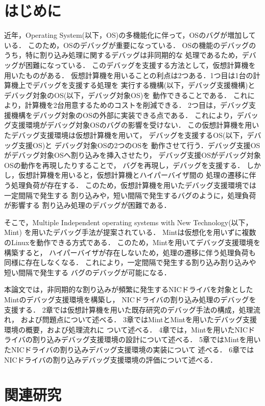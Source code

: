 \documentclass[tanilab-enum]{graduate}
\begin{document}
\chapter{はじめに}\label{chap:introduction}
近年，Operating System(以下，OS)の多機能化に伴って，OSのバグが増加している．
このため，OSのデバッグが重要になっている．
OSの機能のデバッグのうち，特に割り込み処理に関するデバッグは非同期的な
処理であるため，デバッグが困難になっている．
このデバッグを支援する方法として，仮想計算機を用いたものがある．
仮想計算機を用いることの利点は2つある．1つ目は1台の計算機上でデバッグを支援する処理を
実行する機構(以下，デバッグ支援機構)とデバッグ対象のOS(以下，デバッグ対象OS)を
動作できることである．
これにより，計算機を2台用意するためのコストを削減できる．
2つ目は，デバッグ支援機構をデバッグ対象のOSの外部に実装できる点である．
これにより，デバッグ支援環境がデバッグ対象OSのバグの影響を受けない．
この仮想計算機を用いたデバッグ支援環境は仮想計算機を用いて，
デバッグを支援するOS(以下，デバッグ支援OS)と
デバッグ対象OSの2つのOSを
動作させて行う．デバッグ支援OSがデバッグ対象OSへ割り込みを挿入させたり，
デバッグ支援OSがデバッグ対象OSの動作を再現したりすることで，
バグを再現し，デバッグを支援する．
しかし，仮想計算機を用いると，仮想計算機とハイパーバイザ間の
処理の遷移に伴う処理負荷が存在する．
このため，仮想計算機を用いたデバッグ支援環境では一定間隔で発生する
割り込みや，短い間隔で発生するバグのように，処理負荷が影響する
割り込み処理のデバッグが困難である．

そこで，Multiple Independent operating systems with New Technology(以下，Mint)\cite{senzaki}
を用いたデバッグ手法が提案されている．
Mintは仮想化を用いずに複数のLinuxを動作できる方式である．
このため，Mintを用いてデバッグ支援環境を構築すると，
ハイパーバイザが存在しないため，処理の遷移に伴う処理負荷も
同様に存在しなくなる．
これにより，一定間隔で発生する割り込み割り込みや短い間隔で発生する
バグのデバッグが可能になる．

本論文では，非同期的な割り込みが頻繁に発生するNICドライバを対象とした
Mintのデバッグ支援環境を構築し，
NICドライバの割り込み処理のデバッグを支援する．
2章では仮想計算機を用いた既存研究のデバッグ手法の構成，処理流れ，
および問題点について述べる．
3章ではMintとMintを用いたデバッグ支援環境の概要，および処理流れに
ついて述べる．
4章では，Mintを用いたNICドライバの割り込みデバッグ支援環境の設計について述べる．
5章ではMintを用いたNICドライバの割り込みデバッグ支援環境の実装について
述べる．
6章ではNICドライバの割り込みデバッグ支援環境の評価について述べる．
\chapter{関連研究}\label{chap:kanren}
\end{document}
